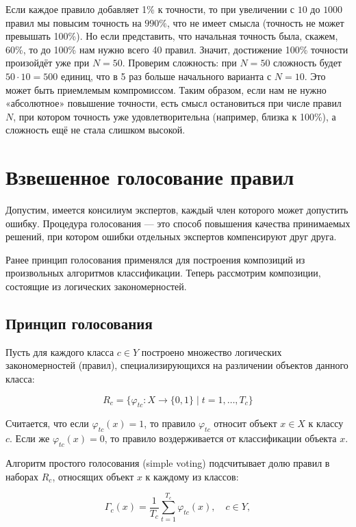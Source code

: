     Если каждое правило добавляет 1\% к точности, то при увеличении с $10$ до $1000$ правил мы повысим точность на $990\%$, что не имеет смысла (точность не может превышать 100\%). Но если представить, что начальная точность была, скажем, 60\%, то до 100\% нам нужно всего 40 правил. Значит, достижение 100\% точности произойдёт уже при $N=50$. Проверим сложность: при $N=50$ сложность будет $50 \cdot 10 = 500$ единиц, что в 5 раз больше начального варианта с $N=10$. Это может быть приемлемым компромиссом. Таким образом, если нам не нужно «абсолютное» повышение точности, есть смысл остановиться при числе правил $N$, при котором точность уже удовлетворительна (например, близка к 100\%), а сложность ещё не стала слишком высокой.






\section{Взвешенное голосование правил}

Допустим, имеется консилиум экспертов, каждый член которого может допустить ошибку. Процедура голосования — это способ повышения качества принимаемых решений, при котором ошибки отдельных экспертов компенсируют друг друга.

Ранее принцип голосования применялся для построения композиций из произвольных алгоритмов классификации. Теперь рассмотрим композиции, состоящие из логических закономерностей.

\subsection{Принцип голосования}

Пусть для каждого класса $c \in Y$ построено множество логических закономерностей (правил), специализирующихся на различении объектов данного класса:

\[
R_c = \{ \varphi_{tc} : X \to \{0, 1\} \mid t = 1, \dots, T_c \}
\]

Считается, что если $\varphi_{tc}(x) = 1$, то правило $\varphi_{tc}$ относит объект $x \in X$ к классу $c$. Если же $\varphi_{tc}(x) = 0$, то правило воздерживается от классификации объекта $x$.

Алгоритм простого голосования (simple voting) подсчитывает долю правил в наборах $R_c$, относящих объект $x$ к каждому из классов:

\[
\Gamma_c(x) = \frac{1}{T_c} \sum_{t=1}^{T_c} \varphi_{tc}(x), \quad c \in Y,
\]

